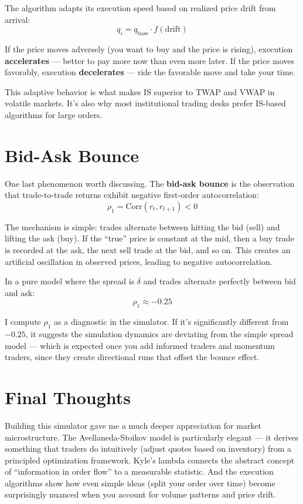\documentclass[11pt]{article}
\begin{document}
The algorithm adapts its execution speed based on realized price drift from arrival:
\[
    q_i = q_{\text{base}} \cdot f(\text{drift})
\]

If the price moves adversely (you want to buy and the price is rising), execution \textbf{accelerates} --- better to pay more now than even more later. If the price moves favorably, execution \textbf{decelerates} --- ride the favorable move and take your time.

This adaptive behavior is what makes IS superior to TWAP and VWAP in volatile markets. It's also why most institutional trading desks prefer IS-based algorithms for large orders.

\section{Bid-Ask Bounce}

One last phenomenon worth discussing. The \textbf{bid-ask bounce} is the observation that trade-to-trade returns exhibit negative first-order autocorrelation:
\[
    \rho_1 = \text{Corr}(r_t, r_{t+1}) < 0
\]

The mechanism is simple: trades alternate between hitting the bid (sell) and lifting the ask (buy). If the ``true'' price is constant at the mid, then a buy trade is recorded at the ask, the next sell trade at the bid, and so on. This creates an artificial oscillation in observed prices, leading to negative autocorrelation.

In a pure model where the spread is $\delta$ and trades alternate perfectly between bid and ask:
\[
    \rho_1 \approx -0.25
\]

I compute $\rho_1$ as a diagnostic in the simulator. If it's significantly different from $-0.25$, it suggests the simulation dynamics are deviating from the simple spread model --- which is expected once you add informed traders and momentum traders, since they create directional runs that offset the bounce effect.

\section{Final Thoughts}

Building this simulator gave me a much deeper appreciation for market microstructure. The Avellaneda-Stoikov model is particularly elegant --- it derives something that traders do intuitively (adjust quotes based on inventory) from a principled optimization framework. Kyle's lambda connects the abstract concept of ``information in order flow'' to a measurable statistic. And the execution algorithms show how even simple ideas (split your order over time) become surprisingly nuanced when you account for volume patterns and price drift.
\end{document}
